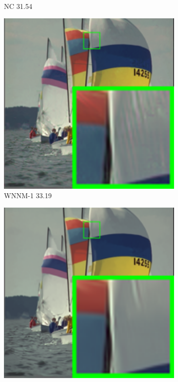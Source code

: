 \begin{figure}
\begin{subfigure}[t]{0.19\textwidth}
		\caption{NC 31.54}
    \end{subfigure}
    \hfill
    \begin{subfigure}[t]{0.19\textwidth}
        \centering
        \includegraphics[width=1\textwidth]{images/mcwnnm/24images/resize_br_WNNMCW_nSig53015_kodim09.png}
		\caption{WNNM-1 33.19}
    \end{subfigure}
    \hfill
    \begin{subfigure}[t]{0.19\textwidth}
        \centering
        \includegraphics[width=1\textwidth]{images/mcwnnm/24images/resize_br_WNNMJ_nSig53015_kodim09.png}

\end{subfigure}
\end{figure}
